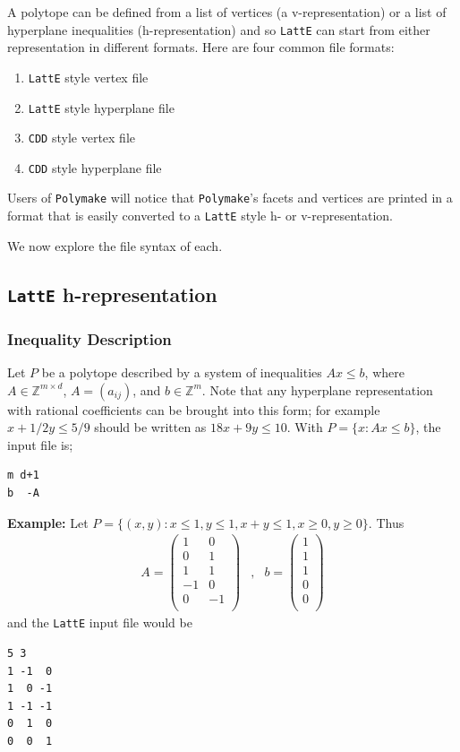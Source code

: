 \documentclass{article}
\newcommand{\Z}{{\mathbb Z}}
\newcommand{\latte}{{\tt LattE}\xspace}
\newcommand{\cdd}{{\tt CDD}\xspace}
\newcommand{\example}{{\bf Example:\space}}
\begin{document}
A polytope can be defined from a list of vertices (a v-representation) or a list of hyperplane inequalities (h-representation) and so \latte can start from either representation in different formats. Here are four common file formats:
\begin{enumerate}
	\item \latte style vertex file
	\item \latte style hyperplane file
	\item \cdd style vertex file
	\item \cdd style hyperplane file
\end{enumerate}

Users of {\tt Polymake} will notice that {\tt Polymake}'s facets and vertices are printed in a format that is easily converted to a \latte style h- or v-representation.

We now explore the file syntax of each.

\subsection{\latte h-representation}

\subsubsection{Inequality Description}
Let $P$ be a polytope described by a
system of inequalities $Ax\leq b$, where $A\in\Z^{m\times d}$, 
$A=(a_{ij})$, and $b\in\Z^m$. Note that any hyperplane representation with rational coefficients can be brought into this form; for example $x + 1/2y \leq 5/9$ should be written as $18x +9y \leq 10$. With $P=\{x : Ax \leq b\}$, the input file is;
\begin{verbatim}
m d+1
b  -A
\end{verbatim}

\example
Let $P=\{(x,y): x\leq 1, y\leq 1, x+y\leq 1, x\geq 0, y\geq 0\}$.
Thus
\[
\begin{array}{ccc}
A=\left(
\begin{array}{rr} 
 1 &  0 \\ 
 0 &  1 \\ 
 1 &  1 \\
-1 &  0 \\ 
 0 & -1 \\ 
\end{array} 
\right) 
& , &
b = \left( 
\begin{array}{r} 
1 \\ 
1 \\ 
1 \\ 
0 \\
0 \\ 
\end{array} 
\right)
\end{array}
\]
and the {\tt LattE} input file would be
\begin{verbatim}
5 3
1 -1  0
1  0 -1
1 -1 -1
0  1  0
0  0  1
\end{verbatim}
\end{document}
